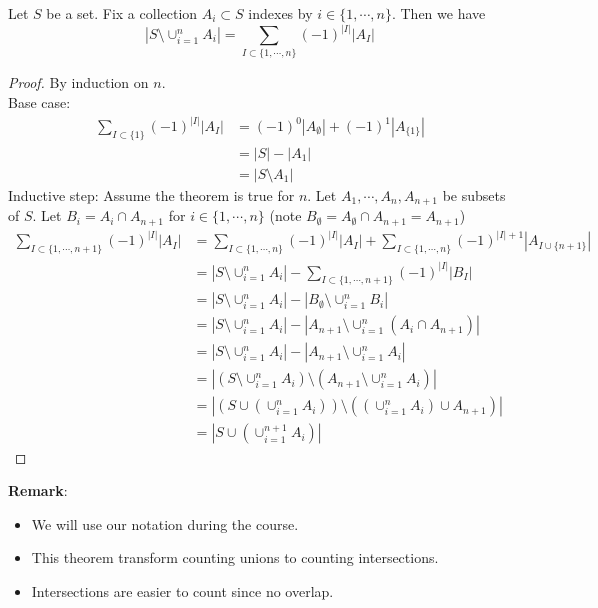\begin{theorem}
    Let $S$ be a set. Fix a collection $A_i \subset S$ indexes by $i \in \{1,\cdots,n\}$. 
    Then we have $$|S \setminus \cup_{i=1}^nA_i|= \sum_{I \subset \{1,\cdots,n\}}(-1)^{|I|}|A_I|$$
\end{theorem}
\begin{proof}
    By induction on $n$.\\
    Base case:
    \begin{equation}
        \begin{split}
            \sum_{I \subset \{1\}}(-1)^{|I|}|A_I| &= (-1)^0|A_{\emptyset}| + (-1)^1|A_{\{1\}}|\\
            &= |S| - |A_{1}|\\
            &= |S \setminus A_1|
        \end{split}
    \end{equation}
    Inductive step: Assume the theorem is true for $n$. Let $A_1,\cdots,A_n,A_{n+1}$ be subsets of $S$. 
    Let $B_i=A_i \cap A_{n+1}$ for $i \in \{1,\cdots,n\}$ (note $B_{\emptyset}=A_{\emptyset}\cap A_{n+1}=A_{n+1}$)
    \begin{equation}
        \begin{split}
            \sum_{I \subset \{1,\cdots,n+1\}}(-1)^{|I|}|A_I| &= \sum_{I \subset \{1,\cdots,n\}}(-1)^{|I|}|A_I| + \sum_{I \subset \{1,\cdots,n\}}(-1)^{|I|+1}|A_{I \cup \{n+1\}}|\\
            &= |S \setminus \cup_{i=1}^nA_i| - \sum_{I \subset \{1,\cdots,n+1\}}(-1)^{|I|}|B_I|\\
            &= |S \setminus \cup_{i=1}^nA_i| -|B_{\emptyset} \setminus \cup_{i=1}^nB_i|\\
            &= |S \setminus \cup_{i=1}^nA_i| -|A_{n+1}\setminus \cup_{i=1}^n(A_i \cap A_{n+1})|\\
            &= |S \setminus \cup_{i=1}^nA_i| -|A_{n+1}\setminus \cup_{i=1}^nA_i|\\
            &= |(S \setminus \cup_{i=1}^nA_i) \setminus (A_{n+1} \setminus \cup_{i=1}^nA_i)|\\
            &= |(S \cup (\cup_{i=1}^nA_i)) \setminus ((\cup_{i=1}^nA_i)\cup A_{n+1})|\\
            &= |S \cup (\cup_{i=1}^{n+1}A_i)|
        \end{split}
    \end{equation}
\end{proof}
\textbf{Remark}:
\begin{itemize}
    \item We will use our notation during the course.
    \item This theorem transform counting unions to counting intersections.
    \item Intersections are easier to count since no overlap.
\end{itemize}

